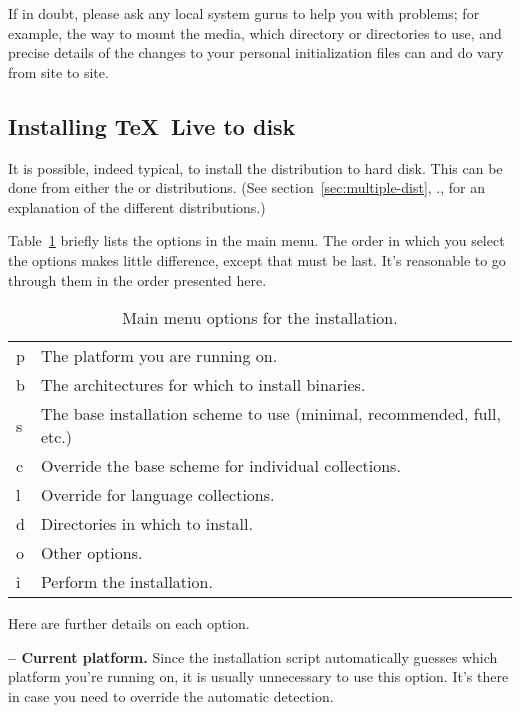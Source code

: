\documentclass{article}
\begin{document}
\def\textifindoubt{%
If in doubt, please ask any local system gurus to help you with
problems; for example, the way to mount the \TL{} media, which
directory or directories to use, and precise details of the changes to
your personal initialization files can and do vary from site to site.
}
\textifindoubt


% 
\subsection{Installing \protect\TeX\protect\ Live to disk}
\label{sec:unix-install-disk}

It is possible, indeed typical, to install the \TL{} distribution to
hard disk.  This can be done from either the  or
 distributions.  (See section~\ref{sec:multiple-dist},
\p.\pageref{sec:multiple-dist}, for an explanation of the different
distributions.)

\startinst
\installtlsh

Table~\ref{tab:main-menu-options} briefly lists the options in the main
menu.  The order in which you select the options makes little
difference, except that  must be last.  It's reasonable to go
through them in the order presented here.

\begin{table}[H]
\caption{Main menu options for the installation.}
\label{tab:main-menu-options}
\begin{tabular}{>{\ttfamily}ll}
p & The platform you are running on.\\
b & The architectures for which to install binaries.\\
s & The base installation scheme to use (minimal, recommended,
          full, etc.)\\
c & Override the base scheme for individual collections.\\
l & Override for language collections.\\
d & Directories in which to install.\\
o & Other options.\\
i & Perform the installation.\\
\end{tabular}
\end{table}

Here are further details on each option.

\textbf{ -- Current platform.}  Since the installation script
automatically guesses which platform you're running on, it is usually
unnecessary to use this option.  It's there in case you need to override
the automatic detection.
\end{document}
